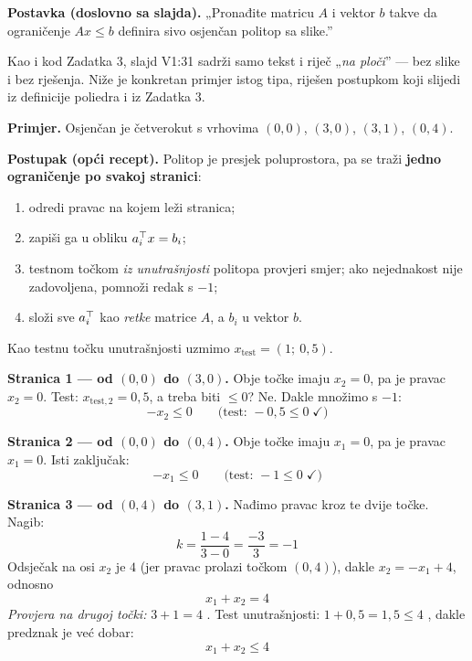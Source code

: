 \begin{zadatak}

\textbf{Postavka (doslovno sa slajda).} „Pronađite matricu $A$ i vektor $b$
takve da ograničenje $Ax \le b$ definira sivo osjenčan politop sa slike.”

\begin{napomena}
Kao i kod Zadatka 3, slajd V1:31 sadrži samo tekst i riječ „\emph{na ploči}”
--- bez slike i bez rješenja. Niže je konkretan primjer istog tipa, riješen
postupkom koji slijedi iz definicije poliedra  i iz Zadatka 3.
\end{napomena}

\textbf{Primjer.} Osjenčan je četverokut s vrhovima
$(0,0)$, $(3,0)$, $(3,1)$, $(0,4)$.

\textbf{Postupak (opći recept).} Politop je presjek poluprostora, pa se traži
\textbf{jedno ograničenje po svakoj stranici}:
\begin{enumerate}
  \item odredi pravac na kojem leži stranica;
  \item zapiši ga u obliku $a_i^{\top} x = b_i$;
  \item testnom točkom \emph{iz unutrašnjosti} politopa provjeri smjer;
        ako nejednakost nije zadovoljena, pomnoži redak s $-1$;
  \item složi sve $a_i^{\top}$ kao \emph{retke} matrice $A$, a $b_i$ u vektor $b$.
\end{enumerate}

Kao testnu točku unutrašnjosti uzmimo $x_{\text{test}} = (1;\ 0{,}5)$.

\textbf{Stranica 1 --- od $(0,0)$ do $(3,0)$.} Obje točke imaju $x_2 = 0$, pa
je pravac $x_2 = 0$. Test: $x_{\text{test},2} = 0{,}5$, a treba biti
$\le 0$? Ne. Dakle množimo s $-1$:
\[
-x_2 \le 0 \qquad\text{(test: } -0{,}5 \le 0 \;\checkmark\text{)}
\]

\textbf{Stranica 2 --- od $(0,0)$ do $(0,4)$.} Obje točke imaju $x_1 = 0$, pa
je pravac $x_1 = 0$. Isti zaključak:
\[
-x_1 \le 0 \qquad\text{(test: } -1 \le 0 \;\checkmark\text{)}
\]

\textbf{Stranica 3 --- od $(0,4)$ do $(3,1)$.} Nađimo pravac kroz te dvije
točke. Nagib:
\[
k = \frac{1 - 4}{3 - 0} = \frac{-3}{3} = -1
\]
Odsječak na osi $x_2$ je $4$ (jer pravac prolazi točkom $(0,4)$), dakle
$x_2 = -x_1 + 4$, odnosno
\[
x_1 + x_2 = 4
\]
\emph{Provjera na drugoj točki:} $3 + 1 = 4$ \checkmark.
Test unutrašnjosti: $1 + 0{,}5 = 1{,}5 \le 4$ \checkmark, dakle predznak je već
dobar:
\[
x_1 + x_2 \le 4
\]


\end{zadatak}
